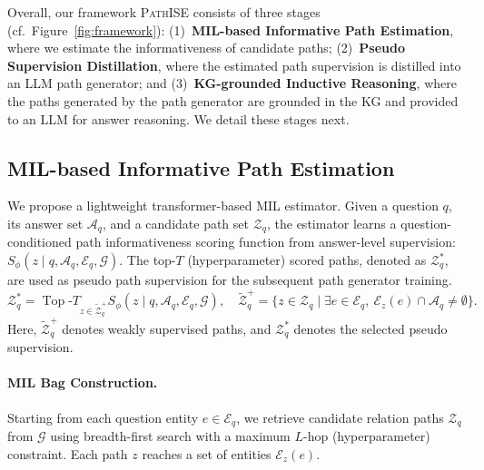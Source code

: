 \documentclass{article}
\newcommand{\framework}{\textsc{PathISE}\xspace}
\begin{document}
Overall, our framework \framework consists of three stages (cf.~Figure~\ref{fig:framework}):
(1)~\textbf{MIL-based Informative Path Estimation}, where we estimate the informativeness of candidate paths; (2)~\textbf{Pseudo Supervision Distillation}, where the estimated path supervision is distilled into an LLM path generator; and (3)~\textbf{KG-grounded Inductive Reasoning},
where the paths generated by the path generator are grounded in the KG and provided to an LLM for answer reasoning. We detail these stages next. 


\subsection{MIL-based Informative Path Estimation}

We propose a lightweight transformer-based MIL estimator. Given a question $q$, its answer set $\mathcal{A}_q$, and a candidate path set $\mathcal{Z}_q$, the estimator learns a question-conditioned path informativeness scoring function from answer-level supervision:
$S_\phi(z \mid q,\mathcal{A}_q,\mathcal{E}_q,\mathcal{G})$. The top-$T$ (hyperparameter) scored paths, denoted as $\mathcal{Z}_q^*$, are used as pseudo path supervision for the subsequent path generator training.
\begin{equation}
\label{eq:path_selection}
\mathcal{Z}_q^*
=
\operatorname{Top}\text{-}T_{z\in\widetilde{\mathcal{Z}}_q^{+}}
S_\phi(z \mid q,\mathcal{A}_q,\mathcal{E}_q,\mathcal{G}),
\quad
\widetilde{\mathcal{Z}}_q^{+}
=
\{z \in \mathcal{Z}_q \mid \exists e\in\mathcal{E}_q,\ 
\mathcal{E}_z(e)\cap \mathcal{A}_q \neq \emptyset\}.
\end{equation}
Here, $\widetilde{\mathcal{Z}}_q^{+}$ denotes weakly supervised paths, and $\mathcal{Z}_q^*$ denotes the selected pseudo supervision. 

\paragraph{MIL Bag Construction.} 
Starting from each question entity $e\in\mathcal{E}_q$, we retrieve candidate relation paths $\mathcal{Z}_q$ from $\mathcal{G}$ using breadth-first search with a maximum $L$-hop (hyperparameter) constraint.
Each path $z$ reaches a set of entities $\mathcal{E}_z(e)$.
\end{document}
